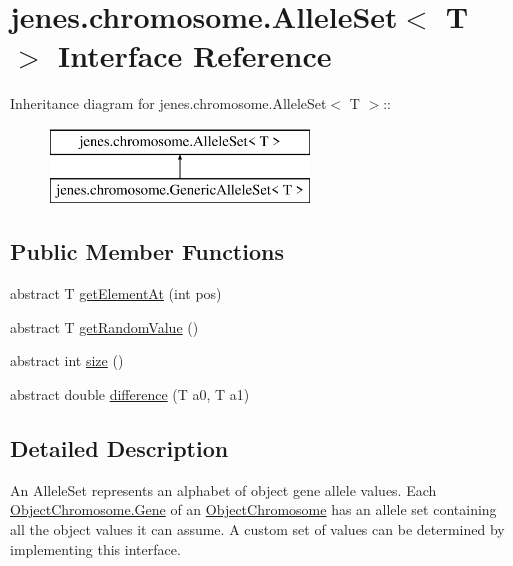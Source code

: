 \hypertarget{interfacejenes_1_1chromosome_1_1_allele_set_3_01_t_01_4}{
\section{jenes.chromosome.AlleleSet$<$ T $>$ Interface Reference}
\label{interfacejenes_1_1chromosome_1_1_allele_set_3_01_t_01_4}
}
Inheritance diagram for jenes.chromosome.AlleleSet$<$ T $>$::\begin{figure}[H]
\begin{center}
\leavevmode
\includegraphics[height=2cm]{interfacejenes_1_1chromosome_1_1_allele_set_3_01_t_01_4}
\end{center}
\end{figure}
\subsection*{Public Member Functions}
\begin{CompactItemize}
\item 
abstract T \hyperlink{interfacejenes_1_1chromosome_1_1_allele_set_3_01_t_01_4_10625403643dc57a5c655a92a49aa644}{getElementAt} (int pos)
\item 
abstract T \hyperlink{interfacejenes_1_1chromosome_1_1_allele_set_3_01_t_01_4_c09d409c55d941892df658d21b3d4bff}{getRandomValue} ()
\item 
abstract int \hyperlink{interfacejenes_1_1chromosome_1_1_allele_set_3_01_t_01_4_3acbb10df92ebafc589d5d8546949f2f}{size} ()
\item 
abstract double \hyperlink{interfacejenes_1_1chromosome_1_1_allele_set_3_01_t_01_4_74ab0cb120fcfdee8e878727d6c50815}{difference} (T a0, T a1)
\end{CompactItemize}


\subsection{Detailed Description}
An AlleleSet represents an alphabet of object gene allele values. Each \hyperlink{}{ObjectChromosome.Gene} of an \hyperlink{classjenes_1_1chromosome_1_1_object_chromosome}{ObjectChromosome} has an allele set containing all the object values it can assume. A custom set of values can be determined by implementing this interface.

